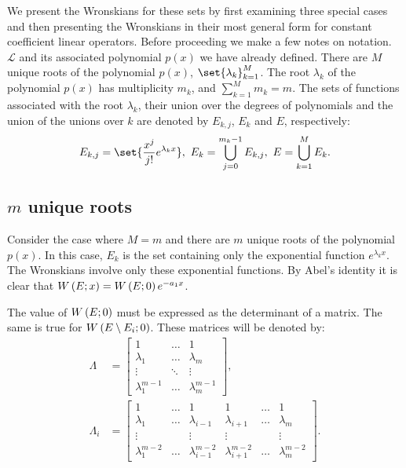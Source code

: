 \documentclass{article}
\begin{document}
We present the Wronskians for these sets by first examining three special cases and then presenting the Wronskians in their most general form for constant coefficient linear operators.
Before proceeding we make a few notes on notation.
$\mathcal{L}$ and its associated polynomial $p(x)$ we have already defined.
There are $M$ unique roots of the polynomial $p(x)$, $\set{\lambda_k}_{k=1}^M$.
The root $\lambda_k$ of the polynomial $p(x)$ has multiplicity $m_k$, and $\sum_{k=1}^M m_k = m$.
The sets of functions associated with the root $\lambda_k$, their union over the degrees of polynomials and the union of the unions over $k$ are denoted by $E_{k,j}$, $E_k$ and $E$, respectively:
\begin{equation*}
E_{k,j} = \set{\Poly{j} e^{\lambda_k x}}, \ E_k = \bigcup_{j=0}^{m_k - 1} E_{k,j}, \ E = \bigcup_{k=1}^M E_k .
\end{equation*}

\subsection{$m$ unique roots}

Consider the case where $M=m$ and there are $m$ unique roots of the polynomial $p(x)$.
In this case, $E_k$ is the set containing only the exponential function $e^{\lambda_k x}$.
The Wronskians involve only these exponential functions.
By Abel's identity it is clear that $W \left ( E ; x \right ) = W \left ( E ; 0 \right ) e^{-a_1 x}$.

The value of $W \left ( E ; 0 \right )$ must be expressed as the determinant of a matrix.
The same is true for $W \left ( E \setminus{E_i} ; 0 \right )$.
These matrices will be denoted by:
\begin{align*}
\Lambda & = \begin{bmatrix} 1 & \dots & 1 \\ \lambda_1 & \dots & \lambda_m \\ \vdots & \ddots & \vdots \\ \lambda_1^{m-1} & \dots & \lambda_m^{m-1} \end{bmatrix}, \\
\Lambda_i & = \begin{bmatrix} 1 & \dots & 1 & 1 & \dots & 1 \\ \lambda_1 & \dots & \lambda_{i-1} & \lambda_{i+1} & \dots & \lambda_m \\ \vdots & & \vdots & \vdots & & \vdots \\ \lambda_1^{m-2} & \dots & \lambda_{i-1}^{m-2} & \lambda_{i+1}^{m-2} & \dots & \lambda_m^{m-2} \end{bmatrix} .
\end{align*}
\end{document}
